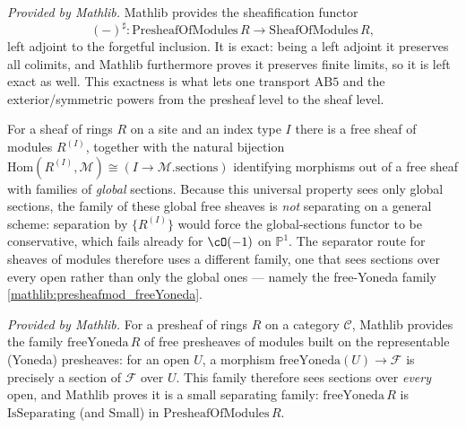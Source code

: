 \begin{lemma}
  \label{mathlib:sheafification_modules_exact}
  \mathlibok
  \textit{Provided by Mathlib.}
  Mathlib provides the sheafification functor
  \[
    (-)^{\sharp}:\mathrm{PresheafOfModules}\,R\to\mathrm{SheafOfModules}\,R ,
  \]
  left adjoint to the forgetful inclusion.  It is exact: being a left adjoint it
  preserves all colimits, and Mathlib furthermore proves it preserves finite
  limits, so it is left exact as well.  This exactness is what lets one transport \(\mathrm{AB5}\) and
  the exterior/symmetric powers from the presheaf level to the sheaf level.
\end{lemma}

\begin{remark}
  For a sheaf of rings \(R\) on a site and an index type \(I\) there is a free
  sheaf of modules \(R^{(I)}\), together with the natural bijection
  \(\mathrm{Hom}(R^{(I)},\mathcal M)\cong (I\to\mathcal M.\mathrm{sections})\)
  identifying morphisms out of a free sheaf with families of \emph{global}
  sections.  Because this universal property sees only global sections, the family
  of these global free sheaves is \emph{not} separating on a general scheme:
  separation by \(\{R^{(I)}\}\) would force the global-sections functor to be
  conservative, which fails already for \(\cO(-1)\) on \(\mathbb P^1\).  The
  separator route for sheaves of modules therefore uses a different family, one
  that sees sections over every open rather than only the global ones --- namely
  the free-Yoneda family \cref{mathlib:presheafmod_freeYoneda}.
\end{remark}

\begin{lemma}
  \label{mathlib:presheafmod_freeYoneda}
  \mathlibok
  \textit{Provided by Mathlib.}
  For a presheaf of rings \(R\) on a category \(\mathcal C\), Mathlib provides the
  family \(\mathrm{freeYoneda}\,R\) of free presheaves of modules built on the
  representable (Yoneda) presheaves: for an open \(U\), a morphism
  \(\mathrm{freeYoneda}(U)\to\mathcal F\) is precisely a section of \(\mathcal F\)
  over \(U\).  This family therefore sees sections over \emph{every} open, and
  Mathlib proves it is a small separating family:
  \(\mathrm{freeYoneda}\,R\) is \(\mathrm{IsSeparating}\) (and \(\mathrm{Small}\))
  in \(\mathrm{PresheafOfModules}\,R\).
\end{lemma}

